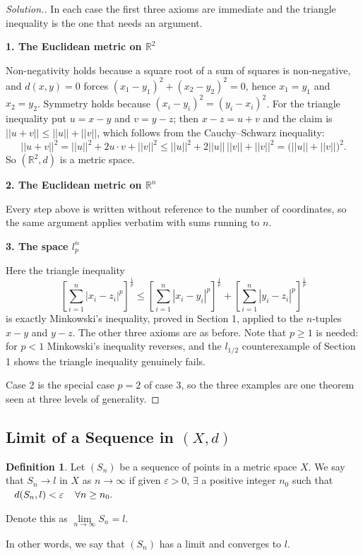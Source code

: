 \documentclass[11pt,a4paper]{article}
\theoremstyle{definition}
\newtheorem{defn}[thm]{Definition}
\newenvironment{solution}
  {\renewcommand{\qedsymbol}{}\begin{proof}[\textit{Solution}.]}
  {\end{proof}}
\newcommand{\subhead}[1]{%
  \par\medskip\noindent\textbf{#1}\par\nobreak\smallskip}
\begin{document}
\begin{solution}
In each case the first three axioms are immediate and the triangle inequality
is the one that needs an argument.

\subhead{1. The Euclidean metric on $\mathbb{R}^2$}
Non-negativity holds because a square root of a sum of squares is
non-negative, and $d(x,y)=0$ forces $(x_1-y_1)^2+(x_2-y_2)^2=0$, hence
$x_1=y_1$ and $x_2=y_2$. Symmetry holds because $(x_i-y_i)^2=(y_i-x_i)^2$. For
the triangle inequality put $u=x-y$ and $v=y-z$; then $x-z=u+v$ and the claim
is $||u+v||\leq||u||+||v||$, which follows from the Cauchy--Schwarz inequality:
$$||u+v||^2=||u||^2+2u\cdot v+||v||^2\leq ||u||^2+2||u||\,||v||+||v||^2
=\big(||u||+||v||\big)^2 .$$
So $(\mathbb{R}^2,d)$ is a metric space.

\subhead{2. The Euclidean metric on $\mathbb{R}^n$}
Every step above is written without reference to the number of coordinates, so
the same argument applies verbatim with sums running to $n$.

\subhead{3. The space $l_p^n$}
Here the triangle inequality
$$\left[\sum_{i=1}^{n}|x_i-z_i|^p\right]^{\frac1p}\leq
\left[\sum_{i=1}^{n}|x_i-y_i|^p\right]^{\frac1p}+
\left[\sum_{i=1}^{n}|y_i-z_i|^p\right]^{\frac1p}$$
is exactly Minkowski's inequality, proved in Section 1, applied to the
$n$-tuples $x-y$ and $y-z$. The other three axioms are as before. Note that
$p\geq 1$ is needed: for $p<1$ Minkowski's inequality reverses, and the
$l_{1/2}$ counterexample of Section 1 shows the triangle inequality genuinely
fails.

Case 2 is the special case $p=2$ of case 3, so the three examples are one
theorem seen at three levels of generality.
\end{solution}


\pagebreak

\subsection{Limit of a Sequence in $(X,d)$}

\begin{defn}
Let $(S_n)$ be a sequence of points in a metric space $X$. We say that $S_n\rightarrow l$ in $X$ as $n\rightarrow \infty$ if given $\varepsilon >0$, $\exists$ a positive integer $n_0$ such that $\hspace{0.3cm}\displaystyle{ d(S_n,l)<\varepsilon \hspace{0.4cm} \forall n\geq n_0}.$


Denote this as $\lim\limits_{n\rightarrow \infty}S_n=l$.


In other words, we say that $(S_n)$ has a limit and converges to $l$.

\end{defn}
\end{document}
